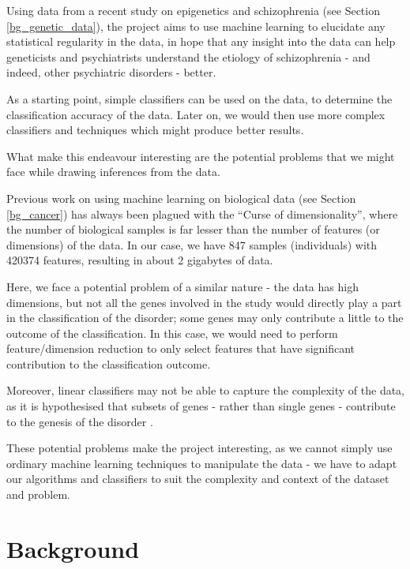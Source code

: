 \documentclass[12pt, twoside, a4paper]{article}
\begin{document}
Using data from a recent study on epigenetics and schizophrenia (see Section \ref{bg_genetic_data}), the project aims to use machine learning to elucidate any statistical regularity in the data, in hope that any insight into the data can help geneticists and psychiatrists understand the etiology of schizophrenia - and indeed, other psychiatric disorders - better.

As a starting point, simple classifiers can be used on the data, to determine the classification accuracy of the data. Later on, we would then use more complex classifiers and techniques which might produce better results.

What make this endeavour interesting are the potential problems that we might face while drawing inferences from the data.

Previous work on using machine learning on biological data (see Section \ref{bg_cancer}) has always been plagued with the ``Curse of dimensionality'', where the number of biological samples is far lesser than the number of features (or dimensions) of the data. In our case, we have 847 samples (individuals) with 420374 features, resulting in about 2 gigabytes of data.

Here, we face a potential problem of a similar nature - the data has high dimensions, but not all the genes involved in the study would directly play a part in the classification of the disorder; some genes may only contribute a little to the outcome of the classification. In this case, we would need to perform feature/dimension reduction to only select features that have significant contribution to the classification outcome.

Moreover, linear classifiers may not be able to capture the complexity of the data, as it is hypothesised that subsets of genes - rather than single genes - contribute to the genesis of the disorder \cite{RefWorks:10}.

These potential problems make the project interesting, as we cannot simply use ordinary machine learning techniques to manipulate the data - we have to adapt our algorithms and classifiers to suit the complexity and context of the dataset and problem.


\section{Background}
\end{document}
